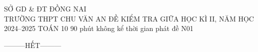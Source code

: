 \SolutionMode
{}

\ExamInfo
    {SỞ GD \& ĐT ĐỒNG NAI\\TRƯỜNG THPT CHU VĂN AN}
    {ĐỀ KIỂM TRA GIỮA HỌC KÌ II, NĂM HỌC 2024--2025}
    {TOÁN 10}
    {90 phút}
    {không kể thời gian phát đề}
    {N01}
\ShowHeaderQR

\MakeExamHeader





\begin{center}
---------HẾT---------
\end{center}
